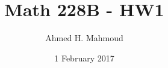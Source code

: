 \documentclass[12pt]{article}
\begin{document}
\title{Math 228B - HW1}
\author{Ahmed H. Mahmoud}
\date{1 February 2017} 

\maketitle



\newpage



\newpage


\newpage





\end{document}
